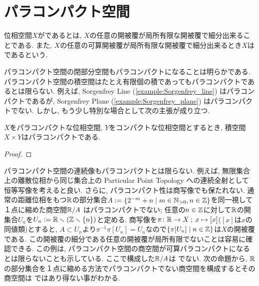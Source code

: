 \documentclass[uplatex, dvipdfmx, a4paper, 12pt, class=jsbook, crop=false]{standalone}
\begin{document}
\section{パラコンパクト空間}
\label{sec:paracompact-spaces}

\newcommand{\starset}[2]{\mathrm{St}\left(#1 , \: #2\right)}
\newcommand{\sstarset}[3]{\mathrm{St}^{#1}\left(#2 , \: #3 \right)}

\begin{definition}
	位相空間$ X $がであるとは, $ X $の任意の開被覆が局所有限な開被覆で細分出来ることである. また, $ X $の任意の可算開被覆が局所有限な開被覆で細分出来るとき$ X $はであるという.
\end{definition}

パラコンパクト空間の閉部分空間もパラコンパクトになることは明らかである. パラコンパクト空間の積空間はたとえ有限個の積であってもパラコンパクトであるとは限らない. 例えば, Sorgenfrey Line (\ref{example:Sorgenfrey_line}) はパラコンパクトであるが, Sorgenfrey Plane (\ref{example:Sorgenfrey_plane}) はパラコンパクトでない. しかし, もう少し特別な場合として次の主張が成り立つ.

\begin{proposition}
	$ X $をパラコンパクトな位相空間, $ Y $をコンパクトな位相空間とするとき, 積空間$ X \times Y $はパラコンパクトである.
\end{proposition}
\begin{proof}
	\WIP
\end{proof}

パラコンパクト空間の連続像もパラコンパクトとは限らない. 例えば, 無限集合上の離散位相から同じ集合上の Particular Point Topology への連続全射として恒等写像を考えると良い. さらに, パラコンパクト性は商写像でも保たれない. 通常の距離位相をもつ$ \mathbb{R} $の部分集合$ A \defeq \setcomp{2^{-m}+n}{m \in \N_{>0}, n \in \Z} $を同一視して１点に縮めた商空間$ \mathbb{R} / A $ はパラコンパクトでない; 任意の$ n \in \mathbb{Z} $に対して$ \mathbb{R} $の開集合$ U_n $を$ U_n \mathrel{:=} \mathbb{R} \smallsetminus (\mathbb{Z} \smallsetminus \{n\}) $と定める. 商写像を$ \pi \colon \mathbb{R} \to X \mathpunct{\: ; \:} x \mapsto [x] $($ [x] $は$ x $の同値類)とすると, $ A \subset U_n $より$ \pi^{-1}\pi[U_n] = U_n $なので$ \setcomp{\pi[U_n]}{n \in \Z} $は$ X $の開被覆である. この開被覆の細分である任意の開被覆が局所有限でないことは容易に確認できる. この例は, パラコンパクト空間の商空間が可算パラコンパクトになるとは限らないことも示している. ここで構成した$ \mathbb{R} / A $は  でない. 次の命題から, $ \mathbb{R} $の部分集合を１点に縮める方法でパラコンパクトでない商空間を構成するとその商空間は  ではあり得ない事がわかる.
\end{document}
